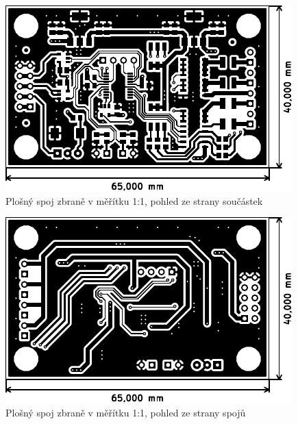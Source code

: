 \begin{figure}[h]
    \centering
    \includegraphics{pcb/gun-top}
    \caption{Plošný spoj zbraně v měřítku 1:1, pohled ze strany součástek}
\end{figure}
\begin{figure}[h]
    \centering
    \includegraphics{pcb/gun-bot}
    \caption{Plošný spoj zbraně v měřítku 1:1, pohled ze strany spojů}
\end{figure}

